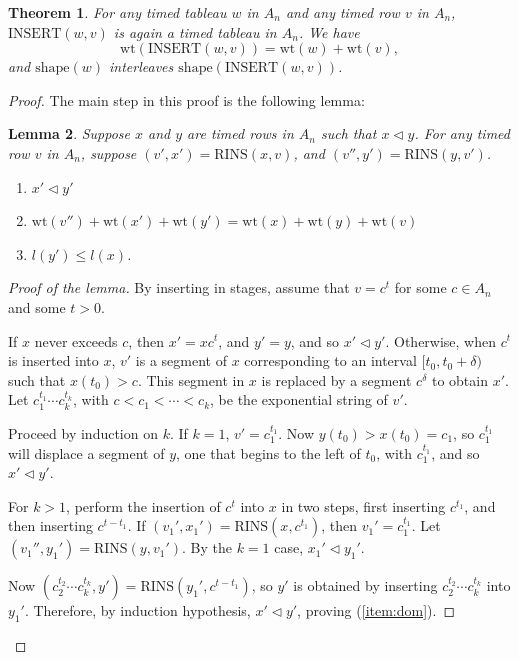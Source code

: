 \documentclass[10pt]{amsproc}
\newtheorem{theorem}{Theorem}[subsection]
\newtheorem{lemma}[theorem]{Lemma}
\theoremstyle{definition}
\theoremstyle{remark}
\newcommand{\rowins}{\mathrm{RINS}}
\newcommand{\ins}{\mathrm{INSERT}}
\newcommand{\wt}{\mathrm{wt}}
\newcommand{\shape}{\mathrm{shape}}
\begin{document}
\begin{theorem}
  \label{theorem:tableauness-of-insertion}
  For any timed tableau $w$ in $A_n$ and any timed row $v$ in $A_n$, $\ins(w,v)$ is again a timed tableau in $A_n$.
  We have
  \begin{displaymath}
    \wt(\ins(w,v)) = \wt(w) + \wt(v),
  \end{displaymath}
  and $\shape(w)$ interleaves $\shape(\ins(w,v))$.
\end{theorem}
\begin{proof}
  The main step in this proof is the following lemma:
  \begin{lemma}
    \label{lemma:tableauness-of-insertion}
    Suppose $x$ and $y$ are timed rows in $A_n$ such that $x\lhd y$.
    For any timed row $v$ in $A_n$, suppose $(v',x')=\rowins(x,v)$, and $(v'',y')=\rowins(y,v')$.
    \begin{enumerate}
    \item \label{item:dom} $x'\lhd y'$
    \item \label{item:wt} $\wt(v'')+\wt(x')+\wt(y')=\wt(x)+\wt(y)+\wt(v)$
    \item \label{item:int} $l(y')\leq l(x)$.
    \end{enumerate}
  \end{lemma}
  \begin{proof}[Proof of the lemma]
    By inserting in stages, assume that $v=c^t$ for some $c\in A_n$ and some $t>0$.

    If $x$ never exceeds $c$, then $x'=xc^t$, and $y'=y$, and so $x'\lhd y'$.
    Otherwise, when $c^t$ is inserted into $x$, $v'$ is a segment of $x$ corresponding to an interval $[t_0,t_0+\delta)$ such that $x(t_0)>c$.
    This segment in $x$ is replaced by a segment $c^\delta$ to obtain $x'$.
    Let $c_1^{t_1}\dotsb c_k^{t_k}$, with $c<c_1< \dotsb <c_k$, be the exponential string of $v'$.

    Proceed by induction on $k$.
    If $k=1$, $v'=c_1^{t_1}$.
    Now $y(t_0)>x(t_0)=c_1$, so $c_1^{t_1}$ will displace a segment of $y$, one that begins to the left of $t_0$, with $c_1^{t_1}$, and so $x'\lhd y'$.

    For $k>1$, perform the insertion of $c^t$ into $x$ in two steps, first inserting $c^{t_1}$, and then inserting $c^{t-t_1}$.
    If $(v_1',x_1')=\rowins(x,c^{t_1})$, then $v_1'=c_1^{t_1}$.
    Let $(v_1'',y_1')=\rowins(y,v_1')$.
    By the $k=1$ case, $x_1'\lhd y_1'$.
    
    Now $(c_2^{t_2}\dotsb c_k^{t_k},y')=\rowins(y_1',c^{t-t_1})$, so $y'$ is obtained by inserting $c_2^{t_2}\dotsb c_k^{t_k}$ into $y_1'$.
    Therefore, by induction hypothesis, $x'\lhd y'$, proving (\ref{item:dom}).


\end{proof}
\end{proof}
\end{document}
